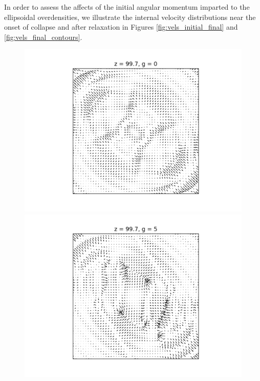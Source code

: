 \documentclass[a4paper,11pt]{article}
\begin{document}
In order to assess the affects of the initial angular momentum imparted to the ellipsoidal overdensities, we illustrate the internal velocity distributions near the onset of collapse and after relaxation in Figures \ref{fig:vels_initial_final} and \ref{fig:vels_final_contours}.


\begin{figure}[!htb]
  \includegraphics[trim={4cm 0 1cm 0cm},scale=0.5]{vel_99_7_g0.png}
\endminipage\hfill
{}
  \includegraphics[trim={4cm 0 1cm 0cm},scale=0.5]{vel_99_7_g5.png}
\endminipage\hfill
{}

\end{figure}
\end{document}
